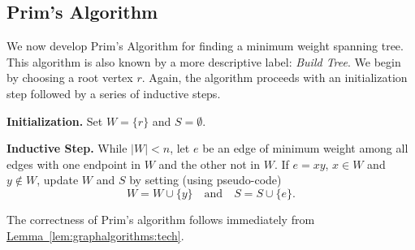 \subsection{Prim's Algorithm}

We now develop Prim's Algorithm for finding a minimum weight spanning
tree. This algorithm is also known by a more descriptive label:
\textit{Build Tree}.  We begin by choosing a root vertex $r$. Again,
the algorithm proceeds with an initialization step followed by a
series of inductive steps.

\medskip
\textbf{Initialization.}\quad
Set $W=\{r\}$ and $S=\emptyset$.

\medskip
\textbf{Inductive Step.}\quad
While $|W| < n$, let $e$ be an edge of minimum weight among
all edges with one endpoint in $W$ and the other not in $W$.
If $e=xy$, $x\in W$ and $y\not\in W$, update $W$ and $S$ by
setting (using pseudo-code)
\[
W = W\cup\{y\}\quad\text{and}\quad S = S\cup\{e\}.
\]

The correctness of Prim's algorithm follows immediately from
\hyperref[lem:graphalgorithms:tech]{Lemma~\ref*{lem:graphalgorithms:tech}}.

